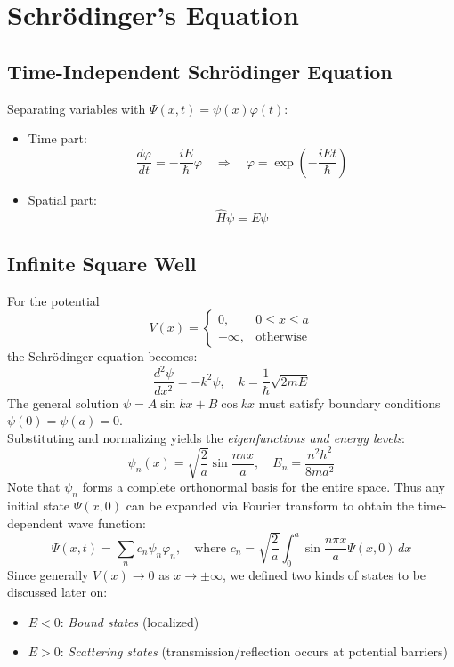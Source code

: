 \chapter{Schr\"odinger's Equation}



\section{Time-Independent Schrödinger Equation}

Separating variables with $\Psi(x,t) = \psi(x)\varphi(t)$:
%
\begin{itemize}
\item Time part:
\[
\frac{d\varphi}{dt} = -\frac{iE}{\hbar}\varphi 
\quad \Rightarrow \quad 
\varphi = \exp\left(-\frac{iEt}{\hbar}\right)
\]
%
\item Spatial part:
\[\boxed{
\hat{H}\psi = E\psi
}\]
\end{itemize}

\section{Infinite Square Well}

For the potential
\[
V(x) = \begin{cases} 0, & 0 \leq x \leq a \\ +\infty, & \text{otherwise} \end{cases}
\]
the Schrödinger equation becomes:
\[
\frac{d^2\psi}{dx^2} = -k^2\psi, \quad
k = \frac{1}{\hbar}\sqrt{2mE}
\]
%
The general solution $\psi = A\sin kx + B\cos kx$ must satisfy boundary conditions $\psi(0) = \psi(a) = 0$.\\
Substituting and normalizing yields the \emph{eigenfunctions and energy levels}:
\[
\psi_n(x) = \sqrt{\frac{2}{a}}\sin\frac{n\pi x}{a}, \quad E_n = \frac{n^2h^2}{8ma^2}
\]
Note that $\psi_n$ forms a complete orthonormal basis for the entire space. Thus any initial state $\Psi(x,0)$ can be expanded via Fourier transform to obtain the time-dependent wave function:
\[
\Psi(x,t) = \sum_n c_n\psi_n\varphi_n, \quad \text{where } c_n = \sqrt{\frac{2}{a}}\int_0^a \sin\frac{n\pi x}{a}\Psi(x,0)\,dx
\]
Since generally $V(x) \to 0$ as $x \to \pm\infty$, we defined two kinds of states to be discussed later on:
\begin{itemize}
    \item $E < 0$: \emph{Bound states} (localized)
    \item $E > 0$: \emph{Scattering states} (transmission/reflection occurs at potential barriers)
\end{itemize}

